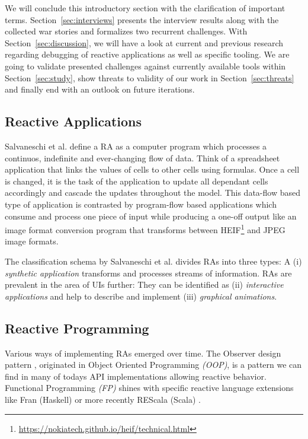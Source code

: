 \documentclass[12pt,a4paper]{article}
\begin{document}
We will conclude this introductory section with the clarification of important terms. Section~\ref{sec:interviews} presents the interview results along with the collected war stories and formalizes two recurrent challenges. With Section~\ref{sec:discussion}, we will have a look at current and previous research regarding debugging of reactive applications as well as specific tooling. We are going to validate presented challenges against currently available tools within Section~\ref{sec:study}, show threats to validity of our work in Section~\ref{sec:threats} and finally end with an outlook on future iterations.

\subsection{Reactive Applications}

Salvaneschi et al. \cite{7827078} define a RA as a computer program which processes a continuos, indefinite and ever-changing flow of data. Think of a spreadsheet application\cite{10.1145/2501654.2501666} that links the values of cells to other cells using formulas. Once a cell is changed, it is the task of the application to update all dependant cells accordingly and cascade the updates throughout the model. This data-flow based type of application is contrasted by program-flow based applications which consume and process one piece of input while producing a one-off output like an image format conversion program that transforms between HEIF\footnote{\url{https://nokiatech.github.io/heif/technical.html}} and JPEG image formats.

The classification schema by Salvaneschi et al. \cite{7827078} divides RAs into three types: A (i) \emph{synthetic application} transforms and processes streams of information. RAs are prevalent in the area of UIs further: They can be identified as (ii) \emph{interactive applications} and help to describe and implement (iii) \emph{graphical animations}.

\subsection{Reactive Programming}

Various ways of implementing RAs emerged over time. The Observer design pattern \cite{gamma1995design}, originated in Object Oriented Programming \emph{(OOP)}, is a pattern we can find in many of todays API implementations\cite{alabor:2019:reactiveappllications} allowing reactive behavior. Functional Programming \emph{(FP)} shines with specific reactive language extensions like Fran (Haskell) \cite{10.1145/2501654.2501666} or more recently REScala (Scala) \cite{10.1145/2577080.2577083}.
\end{document}
